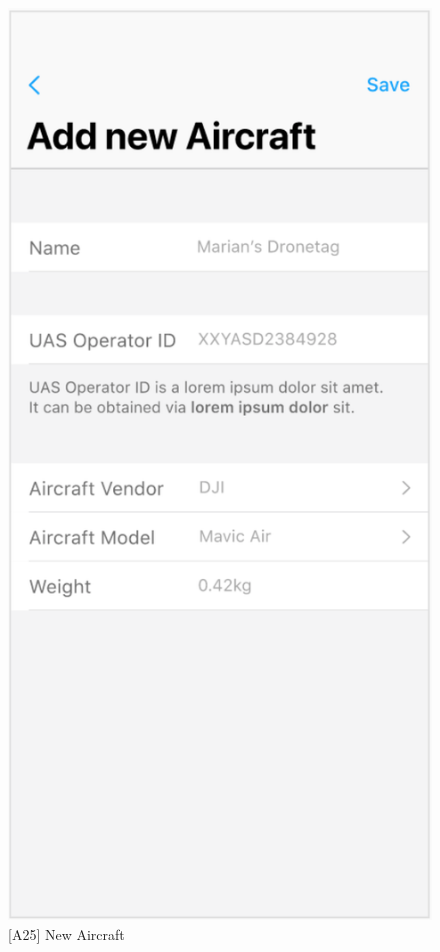 \begin{figure}
\begin{minipage}{.45\textwidth}
        \includegraphics[width=.7\linewidth]{assets/user_interface_design/aircraft/new_aircraft.png}
        \caption{[A25] New Aircraft}
        \label{fig:new_aircraft}
    \end{minipage}
    \label{fig:aircrafts_all}
\end{figure}
